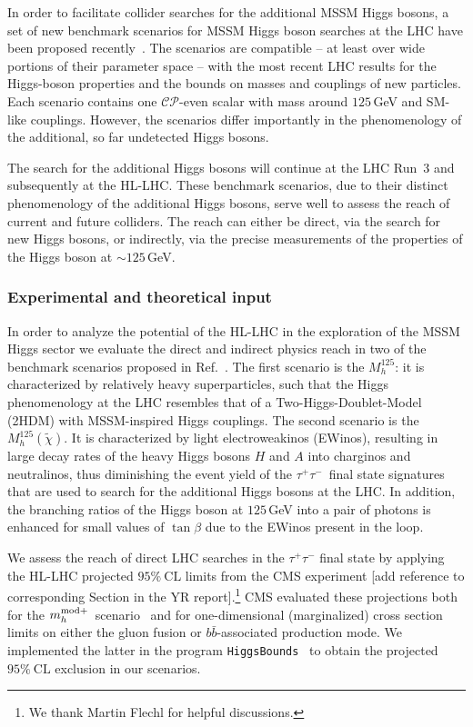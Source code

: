 \documentclass[../report.tex]{subfiles}
\begin{document}
In order to facilitate collider searches for the additional MSSM Higgs bosons, a set of new benchmark scenarios for MSSM Higgs boson searches at the LHC have been proposed recently~\cite{Bahl:2018zmf}. The scenarios are compatible -- at least over wide portions
of their parameter space -- with the most recent LHC results for the
Higgs-boson properties and the bounds on masses and couplings of new
particles. Each scenario contains one $\mathcal{CP}$-even scalar with mass around $125$\,GeV and SM-like couplings. However, the scenarios differ importantly in the phenomenology of the additional, so far undetected Higgs bosons.

The search for the additional Higgs bosons will continue at the LHC
Run~3 and subsequently at the HL-LHC. These benchmark scenarios, due to their distinct phenomenology of the additional Higgs bosons, serve well to assess the reach of current and future colliders. The reach can either be direct, via the search for new Higgs bosons, or indirectly, via the precise measurements of the properties of the Higgs boson at $\sim 125$\,GeV. 

\subsubsection*{Experimental and theoretical input}

In order to analyze the potential of the HL-LHC in the exploration of the MSSM Higgs sector we evaluate the direct and indirect physics reach in two of the benchmark scenarios proposed in Ref.~\cite{Bahl:2018zmf}. The first scenario is the $M_h^{125}$: it is characterized by relatively heavy superparticles, such that the Higgs phenomenology at the LHC resembles that of a Two-Higgs-Doublet-Model (2HDM) with MSSM-inspired Higgs couplings. The second scenario is the $M_h^{125}(\tilde{\chi})$. It is characterized by light electroweakinos (EWinos), resulting in large decay rates of the heavy Higgs bosons $H$ and $A$ into charginos and neutralinos, thus diminishing the event yield of the $\tau^+\tau^-$~final state signatures that are used to search
for the additional Higgs bosons at the LHC. In addition, the branching ratios of the Higgs boson at $125$\,GeV into a pair of photons is enhanced for small values of $\tan\beta$ due to the EWinos present in the loop.

We assess the reach of direct LHC searches in the  $\tau^+\tau^-$
final state by applying the  HL-LHC projected $95\%~\mathrm{CL}$
limits from the CMS experiment {\color{green}[add reference to corresponding Section in the YR report]}.\footnote{We thank Martin Flechl for helpful discussions.} CMS evaluated these projections both
for the $m_h^{{\rm mod}+}$~scenario~\cite{Carena:2013ytb} and for
one-dimensional (marginalized) cross section limits on either the
gluon fusion or $b\bar{b}$-associated production mode. We implemented the latter in the program
\texttt{HiggsBounds}~\cite{Bechtle:2008jh,Bechtle:2011sb,Bechtle:2013wla,Bechtle:2015pma} to obtain the projected $95\%~\mathrm{CL}$ exclusion in our
scenarios.
\end{document}
